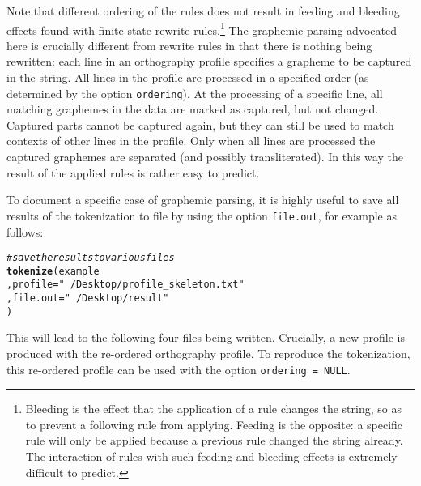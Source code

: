 \documentclass[output=book,nonflat,modfonts,
citecolor=brown,
		]{langsci/langscibook}\usepackage[]{graphicx}\usepackage[]{color}
\makeatletter
\newcommand{\hlstr}[1]{\textcolor[rgb]{0.192,0.494,0.8}{#1}}%
\newcommand{\hlcom}[1]{\textcolor[rgb]{0.678,0.584,0.686}{\textit{#1}}}%
\newcommand{\hlstd}[1]{\textcolor[rgb]{0.345,0.345,0.345}{#1}}%
\newcommand{\hlkwc}[1]{\textcolor[rgb]{0.333,0.667,0.333}{#1}}%
\newcommand{\hlkwd}[1]{\textcolor[rgb]{0.737,0.353,0.396}{\textbf{#1}}}%
\newenvironment{kframe}{%
 \def\at@end@of@kframe{}%
 \ifinner\ifhmode%
  \def\at@end@of@kframe{\end{minipage}}%
  \begin{minipage}{\columnwidth}%
 \fi\fi%
 \def\FrameCommand##1{\hskip\@totalleftmargin \hskip-\fboxsep
 \colorbox{shadecolor}{##1}\hskip-\fboxsep
     \hskip-\linewidth \hskip-\@totalleftmargin \hskip\columnwidth}%
 \MakeFramed {\advance\hsize-\width
   \@totalleftmargin\z@ \linewidth\hsize
   \@setminipage}}%
 {\par\unskip\endMakeFramed%
 \at@end@of@kframe}
\newenvironment{knitrout}{}{} %
\makeatother
\begin{document}
Note that different ordering of the rules does not result in 
feeding and bleeding effects found with finite-state rewrite
rules.\footnote{Bleeding is the effect that the application of a rule changes
the string, so as to prevent a following rule from applying. Feeding is the opposite: a
specific rule will only be applied because a previous rule changed the string
already. The interaction of rules with such feeding and bleeding effects is
extremely difficult to predict.} The graphemic parsing advocated here is 
crucially different from rewrite rules in that there is nothing being rewritten:
each line in an orthography profile specifies a grapheme to be captured in the 
string. All lines in the profile are processed in a specified order (as determined
by the option \texttt{ordering}). At the processing of a specific line, all 
matching graphemes in the data are marked as captured, but not changed. 
Captured parts cannot be captured again, but they can still be used to match 
contexts of other lines in the profile. Only when all lines are processed the 
captured graphemes are separated (and possibly transliterated). In this way the 
result of the applied rules is rather easy to predict.

To document a specific case of graphemic parsing, it is highly useful to save
all results of the tokenization to file by using the option \texttt{file.out},
for example as follows: 

\begin{knitrout}\footnotesize
{}\color{fgcolor}\begin{kframe}
\begin{alltt}
\hlcom{# save the results to various files}
\hlkwd{tokenize}\hlstd{( example}
         \hlstd{,} \hlkwc{profile} \hlstd{=} \hlstr{"~/Desktop/profile_skeleton.txt"}
         \hlstd{,} \hlkwc{file.out} \hlstd{=} \hlstr{"~/Desktop/result"}
        \hlstd{)}
\end{alltt}
\end{kframe}
\end{knitrout}

This will lead to the following four files being written. Crucially, a
new profile is produced with the re-ordered orthography profile. To reproduce
the tokenization, this re-ordered profile can be used with the option
\texttt{ordering~=~NULL}.
\end{document}
